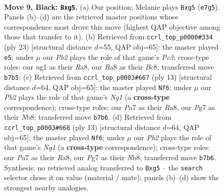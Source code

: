 \documentclass[11pt]{article}
\begin{document}
\clearpage

\begin{figure}[p]\centering
\begin{subfigure}{0.46\textwidth}\centering
\resizebox{\linewidth}{!}{%
\newchessgame
\chessboard[
  setfen={r1bqk2r/pp1nbppp/2p5/3p2B1/3PN3/4P3/PP2BPPP/R2QK1NR b KQkq - 0 9},
  showmover=false,
  pgfstyle=straightmove, color=movearrow, markmove={e7-g5}
]}
\caption{}
\end{subfigure}\hfill
\begin{subfigure}{0.46\textwidth}\centering
\resizebox{\linewidth}{!}{%
\newchessgame
\chessboard[
  setfen={r1bqk2r/p3bpp1/2ppp3/6Bn/4P2P/2N5/PPPQ1P2/R3KBR1 b Qkq - 1 12},
  showmover=false,
  pgfstyle=straightmove, color=movearrow, markmove={e6-e5}
]}
\caption{}
\end{subfigure}
\\[4pt]
\begin{subfigure}{0.46\textwidth}\centering
\resizebox{\linewidth}{!}{%
\newchessgame
\chessboard[
  setfen={rn1qk1nr/pp1bppbp/3p2p1/1B6/2PNP3/2N5/PP3PPP/R1BQK2R b KQkq - 0 7},
  showmover=false,
  pgfstyle=straightmove, color=movearrow, markmove={g8-f6}
]}
\caption{}
\end{subfigure}\hfill
\begin{subfigure}{0.46\textwidth}\centering
\resizebox{\linewidth}{!}{%
\newchessgame
\chessboard[
  setfen={rn1qk1nr/pp1bppbp/3p2p1/1B6/2PNP3/2N5/PP3PPP/R1BQK2R b KQkq - 0 7},
  showmover=false,
  pgfstyle=straightmove, color=movearrow, markmove={g8-f6}
]}
\caption{}
\end{subfigure}
\caption{\textbf{Move 9, Black: \texttt{Bxg5}.} (a) Our position; Melanie plays \texttt{Bxg5} (\texttt{e7g5}). Panels (b)--(d) are the retrieved master positions whose correspondence most drove this move (highest QAP objective among those that transfer to it). (b) Retrieved from \texttt{ccrl\_top\_p0000\#334} (ply 23) [structural distance $d$=55, QAP obj=65]: the master played \texttt{e5}; under $\mu$ our \emph{Pb2} plays the role of that game's \emph{Pe3}; cross-type roles: our \emph{n}g1 as their \emph{R}a8, our \emph{R}a8 as their \emph{B}c8; transferred move \texttt{b7b5}. (c) Retrieved from \texttt{ccrl\_top\_p0003\#667} (ply 13) [structural distance $d$=64, QAP obj=65]: the master played \texttt{Nf6}; under $\mu$ our \emph{Pb2} plays the role of that game's \emph{Ng1} (a \textbf{cross-type} correspondence); cross-type roles: our \emph{P}a7 as their \emph{R}a8, our \emph{P}g7 as their \emph{N}b8; transferred move \texttt{b7b6}. (d) Retrieved from \texttt{ccrl\_top\_p0003\#668} (ply 13) [structural distance $d$=64, QAP obj=65]: the master played \texttt{Nf6}; under $\mu$ our \emph{Pb2} plays the role of that game's \emph{Ng1} (a \textbf{cross-type} correspondence); cross-type roles: our \emph{P}a7 as their \emph{R}a8, our \emph{P}g7 as their \emph{N}b8; transferred move \texttt{b7b6}. Synthesis: no retrieved analog transferred to \texttt{Bxg5} -- the \texttt{search} selector chose it on value (material / mate); panels (b)--(d) show the strongest nearby analogies.}
\label{fig:thought-m17}
\end{figure}
\end{document}
